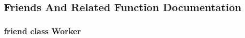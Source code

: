 \subsection{Friends And Related Function Documentation}
\hypertarget{class_osiris_i_1_1_threading_1_1_thread_pool_a9de4a9533dff2ecc0919852d4c05a67b}{
\subsubsection[{Worker}]{\setlength{\rightskip}{0pt plus 5cm}friend class {\bf Worker}\hspace{0.3cm}{\ttfamily [friend]}}}\label{class_osiris_i_1_1_threading_1_1_thread_pool_a9de4a9533dff2ecc0919852d4c05a67b}


